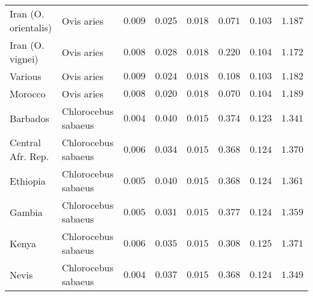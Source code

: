 \documentclass{article}
\begin{document}
\begin{center}
\begin{longtable}{|l|l|r|r|r|r|r|r|}
            Iran (O. orientalis) & Ovis aries          & $ 0.009$        & $ 0.025$                   & $ 0.018$                      & $ 0.071$                             & $ 0.103$                      & $ 1.187$           \\
            Iran (O. vignei)     & Ovis aries          & $ 0.008$        & $ 0.028$                   & $ 0.018$                      & $ 0.220$                             & $ 0.104$                      & $ 1.172$           \\
            Various              & Ovis aries          & $ 0.009$        & $ 0.024$                   & $ 0.018$                      & $ 0.108$                             & $ 0.103$                      & $ 1.182$           \\
            Morocco              & Ovis aries          & $ 0.008$        & $ 0.020$                   & $ 0.018$                      & $ 0.070$                             & $ 0.104$                      & $ 1.189$           \\
            Barbados             & Chlorocebus sabaeus & $ 0.004$        & $ 0.040$                   & $ 0.015$                      & $ 0.374$                             & $ 0.123$                      & $ 1.341$           \\
            Central Afr. Rep.    & Chlorocebus sabaeus & $ 0.006$        & $ 0.034$                   & $ 0.015$                      & $ 0.368$                             & $ 0.124$ & $ 1.370$ \\
            Ethiopia             & Chlorocebus sabaeus & $ 0.005$        & $ 0.040$                   & $ 0.015$                      & $ 0.368$                             & $ 0.124$                      & $ 1.361$           \\
            Gambia               & Chlorocebus sabaeus & $ 0.005$        & $ 0.031$                   & $ 0.015$                      & $ 0.377$                             & $ 0.124$                      & $ 1.359$           \\
            Kenya                & Chlorocebus sabaeus & $ 0.006$        & $ 0.035$                   & $ 0.015$                      & $ 0.308$                             & $ 0.125$                      & $ 1.371$           \\
            Nevis                & Chlorocebus sabaeus & $ 0.004$        & $ 0.037$                   & $ 0.015$                      & $ 0.368$                             & $ 0.124$                      & $ 1.349$           \\

\end{longtable}
\end{center}
\end{document}
